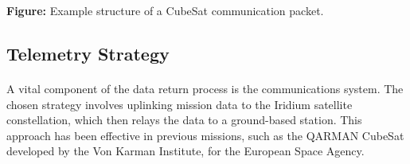 \documentclass[11pt]{article}
\begin{document}
	\begin{center}
		
		\vspace{0.5em}
		\textbf{Figure:} Example structure of a CubeSat communication packet.
	\end{center}
	
	\subsection{Telemetry Strategy}
	
	\paragraph{}A vital component of the data return process is the communications system. The chosen strategy involves uplinking mission data to the Iridium satellite constellation, which then relays the data to a ground-based station. This approach has been effective in previous missions, such as the QARMAN CubeSat developed by the Von Karman Institute, for the European Space Agency.
	
\end{document}
